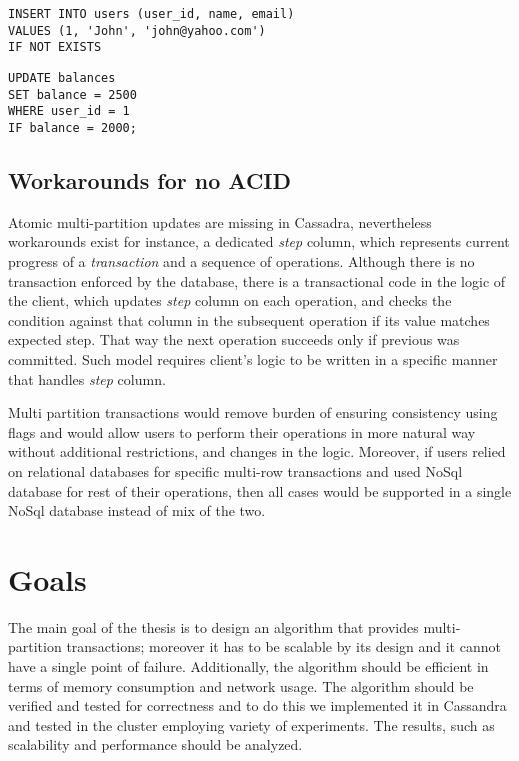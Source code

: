 \begin{example}
\label{lst:intro:lwtInsert}
\begin{lstlisting}[style=outcode,caption={LWT Insert with \code{IF NOT EXISTS} clause}]
INSERT INTO users (user_id, name, email)  
VALUES (1, 'John', 'john@yahoo.com') 
IF NOT EXISTS
\end{lstlisting}
\end{example}

\begin{example}
\label{lst:intro:lwtUpdate}
\begin{lstlisting}[style=outcode,caption={LWT Update with column condition}]
UPDATE balances 
SET balance = 2500 
WHERE user_id = 1
IF balance = 2000;
\end{lstlisting}
\end{example}


\subsection{Workarounds for no ACID}
Atomic multi-partition updates are missing in Cassadra, nevertheless workarounds exist for instance, a dedicated \emph{step} column, which represents current progress of a \emph{transaction} and a sequence of \lwt operations. Although there is no transaction enforced by the database, there is a transactional code in the logic of the client, which updates \emph{step} column on each operation, and checks the condition against that column in the subsequent operation if its value matches expected step. That way the next operation succeeds only if previous was committed. 
Such model requires client's logic to be written in a specific manner that handles \emph{step} column. 

Multi partition transactions would remove burden of ensuring consistency using flags and would allow users to perform their operations in more natural way without additional restrictions, and changes in the logic. Moreover, if users relied on relational databases for specific multi-row transactions and used NoSql database for rest of their operations, then all cases would be supported in a single NoSql database instead of mix of the two.

\section{Goals}
The main goal of the thesis is to design an algorithm that provides multi-partition transactions; moreover it has to be scalable by its design and it cannot have a single point of failure. Additionally, the algorithm should be efficient in terms of memory consumption and network usage. The algorithm should be verified and tested for correctness and to do this we implemented it in Cassandra and tested in the cluster employing variety of experiments. The results, such as scalability and performance should be analyzed.

